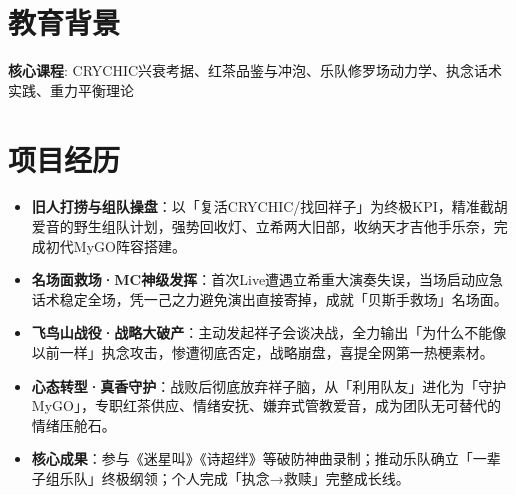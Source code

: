 \documentclass{resume}                      %
\begin{document}


\section{教育背景}

{\small \textbf{核心课程}: CRYCHIC兴衰考据、红茶品鉴与冲泡、乐队修罗场动力学、执念话术实践、重力平衡理论}

\section{项目经历}

\begin{itemize}
    \item \textbf{旧人打捞与组队操盘}：以「复活CRYCHIC/找回祥子」为终极KPI，精准截胡爱音的野生组队计划，强势回收灯、立希两大旧部，收纳天才吉他手乐奈，完成初代MyGO阵容搭建。
    \item \textbf{名场面救场·MC神级发挥}：首次Live遭遇立希重大演奏失误，当场启动应急话术稳定全场，凭一己之力避免演出直接寄掉，成就「贝斯手救场」名场面。
    \item \textbf{飞鸟山战役·战略大破产}：主动发起祥子会谈决战，全力输出「为什么不能像以前一样」执念攻击，惨遭彻底否定，战略崩盘，喜提全网第一热梗素材。
    \item \textbf{心态转型·真香守护}：战败后彻底放弃祥子脑，从「利用队友」进化为「守护MyGO」，专职红茶供应、情绪安抚、嫌弃式管教爱音，成为团队无可替代的情绪压舱石。
    \item \textbf{核心成果}：参与《迷星叫》《诗超绊》等破防神曲录制；推动乐队确立「一辈子组乐队」终极纲领；个人完成「执念→救赎」完整成长线。
\end{itemize}
\end{document}
